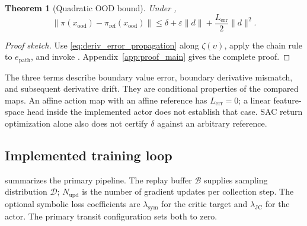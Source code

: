 \documentclass[10pt]{article}
\newtheorem{theorem}{Theorem}[section]
\begin{document}
\begin{theorem}[Quadratic OOD bound]
\label{thm:ood_quad_nD}
Under ,
\begin{equation}
\|\pi(x_{\mathrm{ood}})-\pi_{\mathrm{ref}}(x_{\mathrm{ood}})\|
\leq\delta+\varepsilon\|d\|+
\frac{L_{\mathrm{err}}}{2}\|d\|^2.
\label{eq:ood_bound}
\end{equation}
\end{theorem}
\begin{proof}[Proof sketch]
Use \eqref{eq:deriv_error_propagation} along $\zeta(\upsilon)$, apply the chain rule to $e_{\mathrm{path}}$, and invoke . Appendix~\ref{app:proof_main} gives the complete proof.
\end{proof}

The three terms describe boundary value error, boundary derivative mismatch, and subsequent derivative drift. They are conditional properties of the compared maps. An affine action map with an affine reference has $L_{\mathrm{err}}=0$; a linear feature-space head inside the implemented actor does not establish that case. SAC return optimization alone also does not certify $\delta$ against an arbitrary reference.

\subsection{Implemented training loop}
\label{sec:algorithm}

 summarizes the primary pipeline. The replay buffer $\mathcal{B}$ supplies sampling distribution $\mathcal{D}$; $N_{\mathrm{upd}}$ is the number of gradient updates per collection step. The optional symbolic loss coefficients are $\lambda_{\mathrm{sym}}$ for the critic target and $\lambda_{\mathrm{JC}}$ for the actor. The primary transit configuration sets both to zero.
\end{document}
